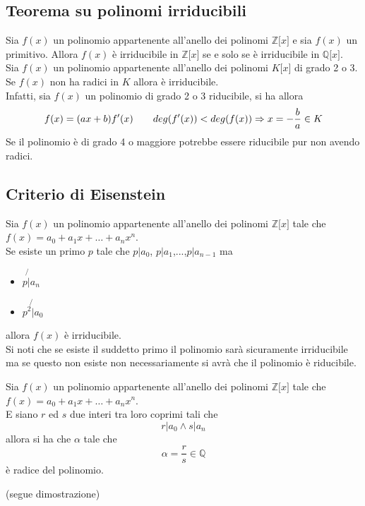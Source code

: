 \begin{flushleft}
\subsection{Teorema su polinomi irriducibili}
Sia $f(x)$ un polinomio appartenente all'anello dei polinomi $\mathbb{Z}\big[x\big]$ e sia $f(x)$ un primitivo.
Allora $f(x)$ è irriducibile in $\mathbb{Z}\big[x\big]$ se e solo se è irriducibile in $\mathbb{Q}\big[x\big]$.\\
Sia $f(x)$ un polinomio appartenente all'anello dei polinomi $K\big[x\big]$ di grado 2 o 3.\\
Se $f(x)$ non ha radici in $K$ allora è irriducibile.\\
Infatti, sia $f(x)$ un polinomio di grado 2 o 3 riducibile, si ha allora
\[f(x) = (ax + b)f'(x)\hspace{20px}deg(f'(x)) < deg(f(x)) \Rightarrow x = -\frac{b}{a}\in K\]
Se il polinomio è di grado 4 o maggiore potrebbe essere riducibile pur non avendo radici.



\subsection{Criterio di Eisenstein}
Sia $f(x)$ un polinomio appartenente all'anello dei polinomi $\mathbb{Z}\big[x\big]$ tale che $f(x) = a_0 + a_1 x +\hdots+a_n x^n$.\\
Se esiste un primo $p$ tale che $p|a_0$, $p|a_1$,...,$p|a_{n-1}$
ma
\begin{itemize}
    \item[] $p\not{|}a_n$
    \item[] $p^2\not{|}a_0$
\end{itemize}
allora $f(x)$ è irriducibile.\\
Si noti che se esiste il suddetto primo il polinomio sarà sicuramente irriducibile ma se questo non esiste non necessariamente si avrà che il polinomio è riducibile.\\
\vspace{20px}
\begin{proprieta}
Sia $f(x)$ un polinomio appartenente all'anello dei polinomi $\mathbb{Z}\big[x\big]$ tale che $f(x) = a_0 + a_1 x +\hdots+a_n x^n$.\\
E siano $r$ ed $s$ due interi tra loro coprimi tali che
\[r|a_0\land s|a_n\]
allora si ha che $\alpha$ tale che
\[\alpha = \frac{r}{s}\in \mathbb{Q}\]
è radice del polinomio.\\
\end{proprieta}
(segue dimostrazione)
\\ \vspace{300px}



\end{flushleft}
